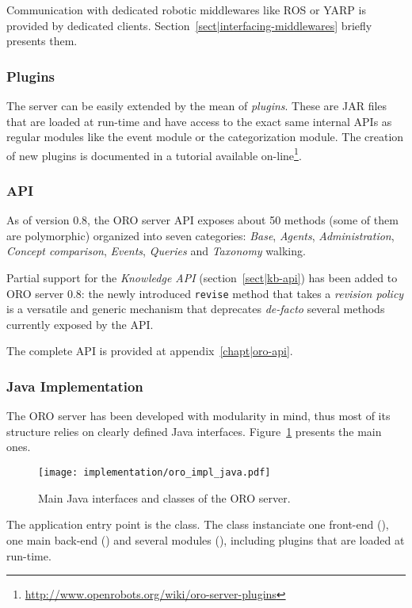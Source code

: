 Communication with dedicated robotic middlewares like ROS or YARP is provided
by dedicated clients. Section~\ref{sect|interfacing-middlewares} briefly
presents them.

\subsubsection{Plugins} The server can be easily extended by the mean of
\emph{plugins}. These are JAR files that are loaded at run-time and have access
to the exact same internal APIs as regular modules like the event module or the
categorization module. The creation of new plugins is documented in a tutorial
available
on-line\footnote{\url{http://www.openrobots.org/wiki/oro-server-plugins}}.

\subsubsection{API}

As of version 0.8, the ORO server API exposes about 50 methods (some of them
are polymorphic) organized into seven categories: \emph{Base}, \emph{Agents},
\emph{Administration}, \emph{Concept comparison}, \emph{Events}, \emph{Queries}
and \emph{Taxonomy} walking.

Partial support for the \emph{Knowledge API} (section~\ref{sect|kb-api}) has
been added to ORO server 0.8: the newly introduced {\tt revise} method that
takes a \emph{revision policy} is a versatile and generic mechanism that
deprecates {\it de-facto} several methods currently exposed by the API.

The complete API is provided at appendix~\ref{chapt|oro-api}.

\subsubsection{Java Implementation}
\label{sect|java-impl}

The ORO server has been developed with modularity in mind, thus most of its
structure relies on clearly defined Java interfaces.
Figure~\ref{fig|oro-impl-java} presents the main ones.

\begin{figure}
    \centering
    \texttt{[image: implementation/oro\_impl\_java.pdf]}
    \caption{Main Java interfaces and classes of the ORO server.}
    \label{fig|oro-impl-java}
\end{figure}

The application entry point is the  class. The class
instanciate one front-end (), one main back-end
() and several modules (),
including plugins that are loaded at run-time.

